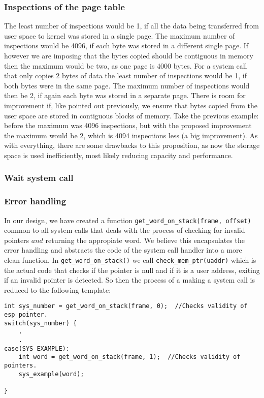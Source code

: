 \documentclass{article}
\renewcommand{\_}{\char`_}
\begin{document}
\subsubsection{Inspections of the page table}
The least number of inspections would be 1, if all the data being transferred from user space to kernel was stored in a single page. The maximum number of inspections would be 4096, if each byte was stored in a different single page. If however we are imposing that the bytes copied should be contiguous in memory then the maximum would be two, as one page is 4000 bytes. For a system call that only copies 2 bytes of data the least number of inspections would be 1, if both bytes were in the same page. The maximum number of inspections would then be 2, if again each byte was stored in a separate page. There is room for improvement if, like pointed out previously, we ensure that bytes copied from the user space are stored in contiguous blocks of memory. Take the previous example: before the maximum was 4096 inspections, but with the proposed improvement the maximum would be 2, which is 4094 inspections less (a big improvement). As with everything, there are some drawbacks to this proposition, as now the storage space is used inefficiently, most likely reducing capacity and performance.

\subsubsection{Wait system call}

\subsubsection{Error handling}

In our design, we have created a function  \lstinline{get_word_on_stack(frame, offset)} common to all system calls that deals with the process of checking for invalid pointers $and$ returning the appropiate word. We believe this encapsulates the error handling and abstracts the code of the system call handler into a more clean function. In \lstinline{get_word_on_stack()} we call \lstinline{check_mem_ptr(uaddr)} which is the actual code that checks if the pointer is null and if it is a user address, exiting if an invalid pointer is detected. So then the process of a making a system call is reduced to the following template:

\begin{lstlisting}
int sys_number = get_word_on_stack(frame, 0);  //Checks validity of esp pointer.
switch(sys_number) {
	.
	.
case(SYS_EXAMPLE):
	int word = get_word_on_stack(frame, 1);  //Checks validity of pointers.
	sys_example(word);

}
\end{lstlisting}
\end{document}
